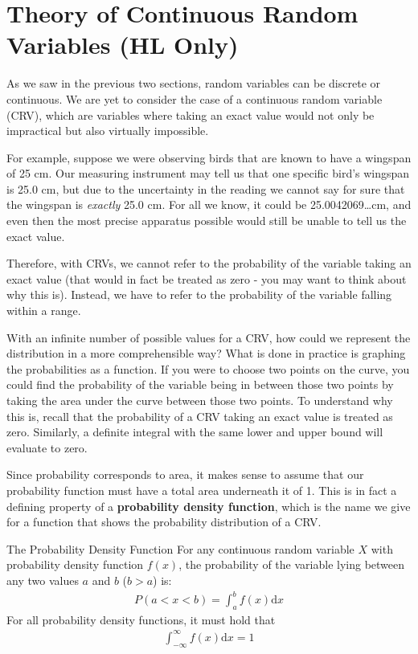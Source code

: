 \newpage

\section{Theory of Continuous Random Variables (HL Only)}
As we saw in the previous two sections, random variables can be discrete or continuous. We are yet to consider the case of a continuous random variable (CRV), which are variables where taking an exact value would not only be impractical but also virtually impossible.

For example, suppose we were observing birds that are known to have a wingspan of 25 cm. Our measuring instrument may tell us that one specific bird's wingspan is 25.0 cm, but due to the uncertainty in the reading we cannot say for sure that the wingspan is \textit{exactly} 25.0 cm. For all we know, it could be 25.0042069\dots cm, and even then the most precise apparatus possible would still be unable to tell us the exact value. 

Therefore, with CRVs, we cannot refer to the probability of the variable taking an exact value (that would in fact be treated as zero - you may want to think about why this is). Instead, we have to refer to the probability of the variable falling within a range.

With an infinite number of possible values for a CRV, how could we represent the distribution in a more comprehensible way? What is done in practice is graphing the probabilities as a function. If you were to choose two points on the curve, you could find the probability of the variable being in between those two points by taking the area under the curve between those two points. To understand why this is, recall that the probability of a CRV taking an exact value is treated as zero. Similarly, a definite integral with the same lower and upper bound will evaluate to zero.

Since probability corresponds to area, it makes sense to assume that our probability function must have a total area underneath it of 1. This is in fact a defining property of a \textbf{probability density function}, which is the name we give for a function that shows the probability distribution of a CRV.

\begin{theorem}{The Probability Density Function}
For any continuous random variable $X$ with probability density function $f(x)$, the probability of the variable lying between any two values $a$ and $b$ ($b > a$) is:
\begin{align}
    P(a<x<b) = \int_a^b f(x) \mathrm dx
\end{align}
For all probability density functions, it must hold that
\begin{align}
    \int_{-\infty}^{\infty} f(x) \mathrm dx = 1
\end{align}
\end{theorem}

